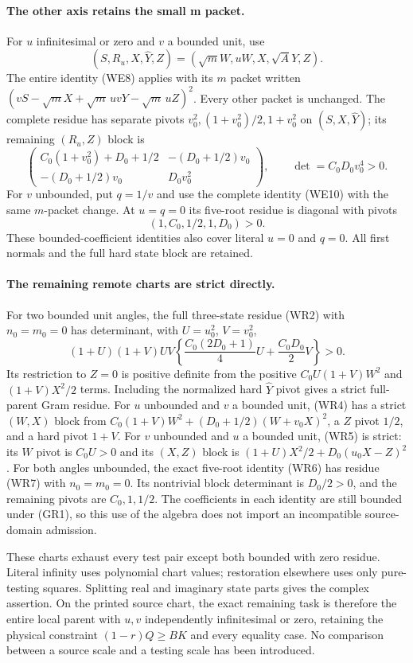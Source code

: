 \paragraph{The other axis retains the small m packet.}
For $u$ infinitesimal or zero and $v$ a bounded unit, use
\[
 (S,R_u,X,\widehat Y,Z)=(\sqrt m W,uW,X,\sqrt A Y,Z).
\]
The entire identity (WE8) applies with its $m$ packet written
$(vS-\sqrt m X+\sqrt m\,uvY-\sqrt m\,uZ)^2$.
Every other packet is unchanged. The complete residue has separate
pivots $v_0^2,(1+v_0^2)/2,1+v_0^2$ on
$(S,X,\widehat Y)$; its remaining $(R_u,Z)$ block is
\[
 \begin{pmatrix}
 C_0(1+v_0^2)+D_0+1/2&-(D_0+1/2)v_0\\
 -(D_0+1/2)v_0&D_0v_0^2
 \end{pmatrix},\qquad \det=C_0D_0v_0^4>0.           \tag{GR5}
\]
For $v$ unbounded, put $q=1/v$ and use the complete identity
(WE10) with the same $m$-packet change. At $u=q=0$ its five-root
residue is diagonal with pivots
\[
 (1,C_0,1/2,1,D_0)>0.                              \tag{GR6}
\]
These bounded-coefficient identities also cover literal $u=0$ and
$q=0$. All first normals and the full hard state block are retained.

\paragraph{The remaining remote charts are strict directly.}
For two bounded unit angles, the full three-state residue (WR2)
with $n_0=m_0=0$ has determinant, with $U=u_0^2$, $V=v_0^2$,
\[
 (1+U)(1+V)UV\left\{
 \frac{C_0(2D_0+1)}4U+\frac{C_0D_0}2V\right\}>0.    \tag{GR7}
\]
Its restriction to $Z=0$ is positive definite from the positive
$C_0U(1+V)W^2$ and $(1+V)X^2/2$ terms. Including the normalized
hard $\widehat Y$ pivot gives a strict full-parent Gram residue.
For $u$ unbounded and $v$ a bounded unit, (WR4) has a strict
$(W,X)$ block from $C_0(1+V)W^2+(D_0+1/2)(W+v_0X)^2$,
a $Z$ pivot $1/2$, and a hard pivot $1+V$.
For $v$ unbounded and $u$ a bounded unit, (WR5) is strict:
its $W$ pivot is $C_0U>0$ and its $(X,Z)$ block is
$(1+U)X^2/2+D_0(u_0X-Z)^2$.
For both angles unbounded, the exact five-root identity (WR6)
has residue (WR7) with $n_0=m_0=0$. Its nontrivial block determinant
is $D_0/2>0$, and the remaining pivots are $C_0,1,1/2$.
The coefficients in each identity are still bounded under (GR1),
so this use of the algebra does not import an incompatible source-domain
admission.

These charts exhaust every test pair except both bounded with zero
residue. Literal infinity uses polynomial chart values; restoration
elsewhere uses only pure-testing squares. Splitting real and imaginary
state parts gives the complex assertion. On the printed source chart,
the exact remaining task is therefore the entire local parent with
$u,v$ independently infinitesimal or zero, retaining the physical
constraint $(1-r)Q\ge BK$ and every equality case. No comparison
between a source scale and a testing scale has been introduced.
